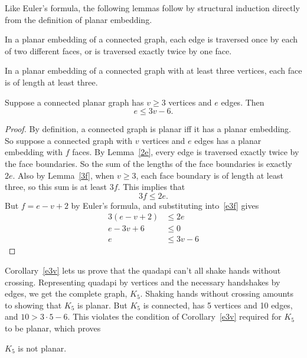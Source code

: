 Like Euler's formula, the following lemmas follow by structural induction
directly from the definition of planar embedding.

\begin{lemma}\label{2e}
In a planar embedding of a connected graph, each edge is traversed once by
each of two different faces, or is traversed exactly twice by one face.
\end{lemma}

\begin{lemma}\label{3f}
  In a planar embedding of a connected graph with at least three vertices,
  each face is of length at least three.
\end{lemma}

\begin{corollary}
\label{e3v}
Suppose a connected planar graph has $v \geq 3$ vertices and $e$ edges.
Then
\[
e \leq 3v-6.
\]
\end{corollary}

\begin{proof}
By definition, a connected graph is planar iff it has a planar embedding.
So suppose a connected graph with $v$ vertices and $e$ edges has a planar
embedding with $f$ faces.  By Lemma~\ref{2e}, every edge is traversed
exactly twice by the face boundaries.  So the sum of the lengths of the
face boundaries is exactly $2e$.  Also by Lemma~\ref{3f}, when $v \geq 3$,
each face boundary is of length at least three, so this sum is at least
$3f$.  This implies that
\begin{equation}\label{e3f}
3f \leq 2e.
\end{equation}
But $f = e-v+2$ by Euler's formula, and substituting into~\eqref{e3f} gives
\begin{align*}
3(e-v+2) & \leq 2e\\
e-3v + 6  & \leq 0\\
e & \leq 3v - 6
\end{align*}
\end{proof}

Corollary~\ref{e3v} lets us prove that the quadapi can't all shake hands
without crossing.  Representing quadapi by vertices and the necessary
handshakes by edges, we get the complete graph, $K_5$.  Shaking hands
without crossing amounts to showing that $K_5$ is planar.  But $K_5$ is
connected, has 5 vertices and 10 edges, and $10 > 3 \cdot 5-6$.  This
violates the condition of Corollary~\ref{e3v} required for $K_5$ to be
planar, which proves

\begin{lemma}\label{k5not}
$K_5$ is not planar.
\end{lemma}

